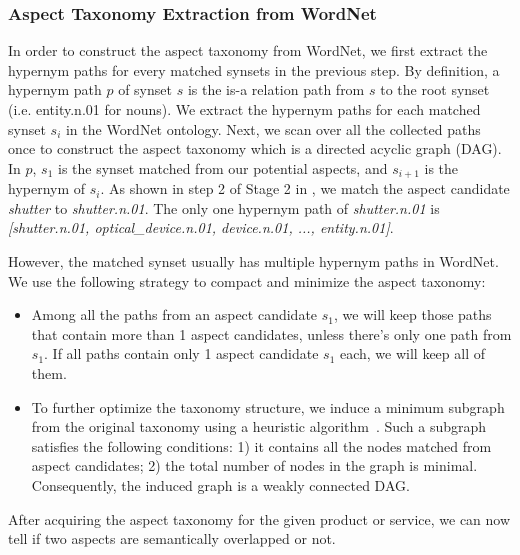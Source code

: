 \subsubsection{Aspect Taxonomy Extraction from WordNet}
\label{wordnet}
In order to construct the aspect taxonomy from WordNet,
we first extract the hypernym paths for every matched synsets
in the previous step.
By definition, 
a hypernym path $p$ of synset $s$ is the is-a relation path 
from $s$ to the root synset (i.e. entity.n.01 for nouns).
We extract the hypernym paths for each matched synset $s_i$ 
in the WordNet ontology.
Next, we scan over all the collected paths once to construct
the aspect taxonomy which is a directed acyclic graph (DAG).
In $p$, $s_1$ is the synset matched from our potential aspects,
and $s_{i+1}$ is the hypernym of $s_i$.
As shown in step 2 of Stage 2 in ,
we match the aspect candidate \emph{shutter} to \emph{shutter.n.01}.
The only one hypernym path of \emph{shutter.n.01} is 
\emph{[shutter.n.01, optical\_device.n.01, device.n.01, ..., entity.n.01]}.

However, the matched synset usually has multiple hypernym paths 
in WordNet. 
We use the following strategy to compact and minimize the
aspect taxonomy:
\begin{itemize}
	\item Among all the paths from an aspect candidate $s_1$, 
we will keep those paths that contain more than 1 aspect candidates, 
unless there's only one path from $s_1$.
If all paths contain only 1 aspect candidate $s_1$ each, we will keep all of them.

	\item To further optimize the taxonomy structure, we 
induce a minimum subgraph from the original taxonomy using
a heuristic algorithm~\cite{kou1981fast}. Such a subgraph
satisfies the following conditions: 
1) it contains all the nodes matched from aspect candidates;
2) the total number of nodes in the graph is minimal.
Consequently, the induced graph is a weakly connected DAG.
\end{itemize}
After acquiring the aspect taxonomy for the given product or service,
we can now tell if two aspects are semantically overlapped or not. 

